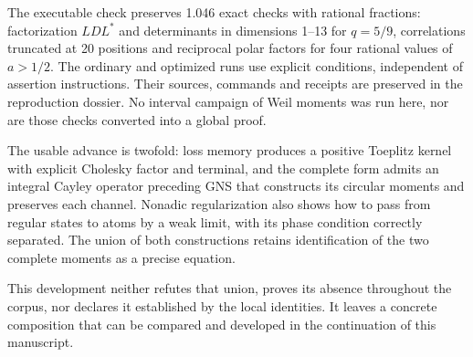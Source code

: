 % 
The executable check preserves 1.046 exact checks with rational fractions: factorization \(LDL^*\) and determinants in dimensions 1–13 for \(q=5/9\), correlations truncated at 20 positions and reciprocal polar factors for four rational values of \(a>1/2\). The ordinary and optimized runs use explicit conditions, independent of assertion instructions. Their sources, commands and receipts are preserved in the reproduction dossier. No interval campaign of Weil moments was run here, nor are those checks converted into a global proof.

The usable advance is twofold: loss memory produces a positive Toeplitz kernel with explicit Cholesky factor and terminal, and the complete form admits an integral Cayley operator preceding GNS that constructs its circular moments and preserves each channel. Nonadic regularization also shows how to pass from regular states to atoms by a weak limit, with its phase condition correctly separated. The union of both constructions retains identification of the two complete moments as a precise equation.

This development neither refutes that union, proves its absence throughout the corpus, nor declares it established by the local identities. It leaves a concrete composition that can be compared and developed in the continuation of this manuscript.
